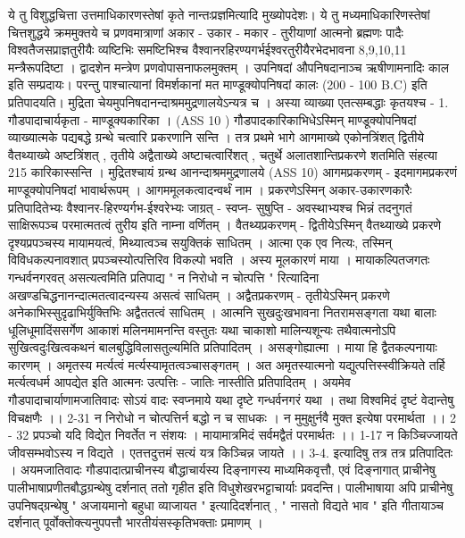 ये तु विशुद्धचित्ता उत्तमाधिकारणस्तेषां कृते नान्तःप्रज्ञमित्यादि मुख्योपदेशः। ये तु मध्यमाधिकारिणस्तेषां चित्तशुद्धये क्रममुक्तये च प्रणवमात्राणां अकार - उकार - मकार - तुरीयाणां आत्मनो ब्रह्मणः पादैः विश्वतैजसप्राज्ञतुरीयैः व्यष्टिभिः समष्टिभिश्च वैश्वानरहिरण्यगर्भईश्वरतुरीयैरभेदभावना  8,9,10,11 मन्त्रैरूपदिष्टा । द्वादशेन मन्त्रेण प्रणवोपासनाफलमुक्तम् ।
उपनिषदां औपनिषदानाञ्च ऋषीणामनादिः काल इति सम्प्रदायः। परन्तु पाश्चात्यानां विमर्शकानां मत माण्डूक्योपनिषदां कालः (200 - 100 B.C) इति प्रतिपादयति। मुद्रिता चेयमुपनिषदानन्दाश्रममुद्रणालयेऽन्यत्र च । 
अस्या व्याख्या एतत्सम्बद्धाः कृतयश्च - 
1.  गौडपादाचार्यकृता - माण्डूक्यकारिका ।  (ASS 10 ) 
गौडपादकारिकाभिधेऽस्मिन् माण्डूक्योपनिषदां व्याख्यात्मके पद्यबद्धे ग्रन्थे चत्वारि प्रकरणानि सन्ति । तत्र प्रथमे भागे आगमाख्ये एकोनत्रिंशत् द्वितीये वैतथ्याख्ये अष्टत्रिंशत् , तृतीये अद्वैताख्ये अष्टाचत्वारिंशत् , चतुर्थे अलातशान्तिप्रकरणे शतमिति संहत्या 215 कारिकास्सन्ति । मुद्रितश्चायं ग्रन्थ आनन्दाश्रममुद्रणालये (ASS 10) 
आगमप्रकरणम् - इदमागमप्रकरणं माण्डूक्योपनिषदां भावार्थरूपम् । आगममूलकत्वादन्वर्थं नाम । प्रकरणेऽस्मिन् अकार-उकारणकारैः प्रतिपादितेभ्यः वैश्वानर-हिरण्यर्गभ-ईश्वरेभ्यः जाग्रत् - स्वप्न- सुषुप्ति - अवस्थाभ्यश्च भिन्नं तदनुगतं साक्षिरूपञ्च परमात्मतत्वं तुरीय इति नाम्ना वर्णितम् । 
वैतथ्यप्रकरणम् - 
द्वितीयेऽस्मिन् वैतथ्याख्ये प्रकरणे दृश्यप्रपञ्चस्य मायामयत्वं, मिथ्यात्वञ्च सयुक्तिकं साधितम् । आत्मा एक एव नित्यः, तस्मिन् विविधकल्पनावशात् प्रपञ्चस्योत्पत्तिरिव विकल्पो भवति । अस्य मूलकारणं माया । मायाकल्पितजगतः गन्धर्वनगरवत् असत्यत्वमिति प्रतिपाद्य " न निरोधो न चोत्पत्ति " रित्यादिना अखण्डचिद्धनानन्दात्मतत्वादन्यस्य असत्वं साधितम् ।
अद्वैतप्रकरणम् -
तृतीयेऽस्मिन् प्रकरणे अनेकाभिस्सुदृढाभिर्युक्तिभिः अद्वैततत्वं साधितम् । आत्मनि सुखदुःखभावना नितरामसङ्गता यथा बालाः धूलिधूमादिंससर्गेण आकाशं मलिनमामनन्ति वस्तुतः यथा चाकाशो मालिन्यशून्यः तथैवात्मनोऽपि सुखित्वदुःखित्वकथनं बालबुद्धिविलासतुल्यमिति प्रतिपादितम् । असङ्गोह्यात्मा । माया हि द्वैतकल्पनायाः कारणम् । अमृतस्य मर्त्यत्वं मर्त्यस्यामृतत्वञ्चासङ्गतम् । अत अमृतस्यात्मनो यद्युत्पत्तिस्स्वीक्रियते तर्हि मर्त्यत्वधर्म आपद्येत इति आत्मनः उत्पत्तिः - जातिः नास्तीति प्रतिपादितम् । अयमेव गौडपादाचार्याणामजातिवादः सोऽयं वादः 
स्वप्नमाये यथा दृष्टे गन्धर्वनगरं यथा ।
तथा विश्वमिदं दृष्टं वेदान्तेषु विचक्षणैः ।। 2-31 
न निरोधो न चोत्पत्तिर्न बद्धो न च साधकः । 
न मुमुक्षुर्नवै मुक्त इत्येषा परमार्थता ।। 2 - 32 
प्रपञ्चो यदि विद्येत निवर्तेत न संशयः । 
मायामात्रमिदं सर्वमद्वैतं परमार्थतः ।। 1-17
न किञ्चिज्जायते जीवसम्भवोऽस्य न विद्यते ।
एतत्तदुत्तमं सत्यं यत्र किञ्चिन्न जायते ।। 3-4. 
इत्यादिषु तत्र तत्र प्रतिपादितः ।
अयमजातिवादः गौडपादात्प्राचीनस्य बौद्धाचार्यस्य दिङ्नागस्य माध्यमिकवृत्तौ, एवं दिङ्नागात् प्राचीनेषु पालीभाषाप्रणीतबौद्धग्रन्थेषु दर्शनात् ततो गृहीत इति विधुशेखरभट्टाचार्याः प्रवदन्ति। पालीभाषाया अपि प्राचीनेषु उपनिषद्ग्रन्थेषु " अजायमानो बहुधा व्याजायत " इत्यादिदर्शनात् , " नासतो विद्यते भाव " इति गीतायाञ्च दर्शनात् पूर्वोक्तोक्त्यनुपपत्तौ भारतीयंसस्कृतिभक्ताः प्रमाणम् । 
